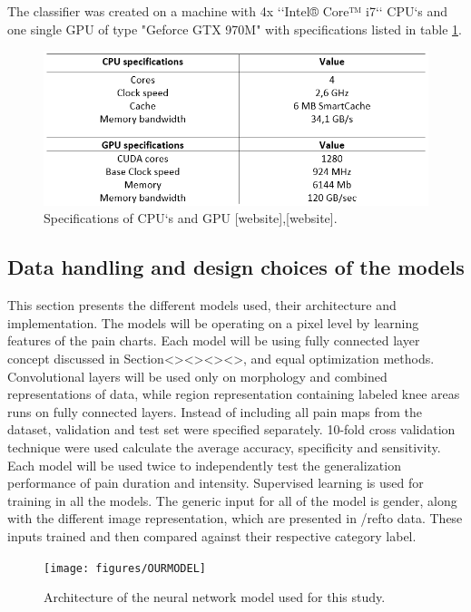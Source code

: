 \noindent
The classifier was created on a machine with 4x ‘‘Intel® Core™ i7‘‘ CPU‘s and one single GPU of type "Geforce GTX 970M" with specifications listed in table \ref{fig:Specs}.

\begin{figure} [H]
\centering
\includegraphics[width=1\textwidth]{figures/Specs}
\caption{Specifications of CPU‘s and GPU [website],[website].}
\label{fig:Specs}
\end{figure}

\subsection{Data handling and design choices of the models}
This section presents the different models used, their architecture and implementation.
The models will be operating on a pixel level by learning features of the pain charts.
Each model will be using fully connected layer concept discussed in Section<><><><>, and equal optimization methods. Convolutional layers will be used only on morphology and combined representations of data, while region representation containing labeled knee areas runs on fully connected layers.
Instead of including all pain maps from the dataset, validation and test set were specified separately. 10-fold cross validation technique were used calculate the average accuracy, specificity and sensitivity. Each model will be used twice to independently test the generalization performance of pain duration and intensity. Supervised learning is used for training in all the models. The generic input for all of the model is gender, along with the different image representation, which are presented in /ref{to data}. These inputs trained and then compared against their respective category label. 

\begin{figure} [H]
\centering
\texttt{[image: figures/OURMODEL]}
\caption{Architecture of the neural network model used for this study.}
\label{fig:OURMODEL} 
\end{figure}

